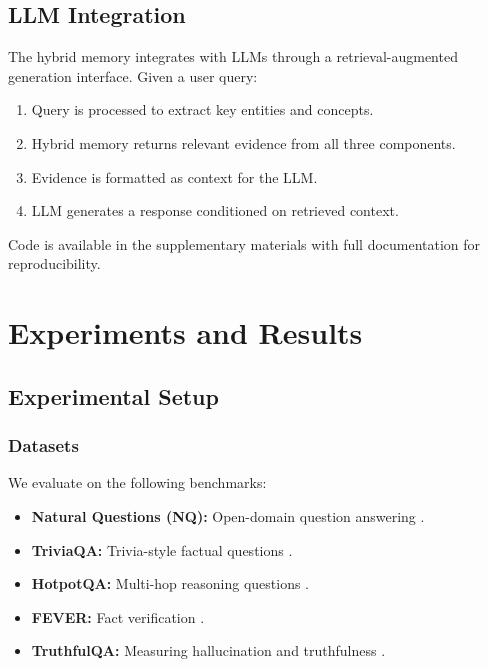 \documentclass[conference]{IEEEtran}
\begin{document}
\subsection{LLM Integration}

The hybrid memory integrates with LLMs through a retrieval-augmented generation interface. Given a user query:

\begin{enumerate}
    \item Query is processed to extract key entities and concepts.
    \item Hybrid memory returns relevant evidence from all three components.
    \item Evidence is formatted as context for the LLM.
    \item LLM generates a response conditioned on retrieved context.
\end{enumerate}

Code is available in the supplementary materials with full documentation for reproducibility.

\section{Experiments and Results}

\subsection{Experimental Setup}

\subsubsection{Datasets}

We evaluate on the following benchmarks:

\begin{itemize}
    \item \textbf{Natural Questions (NQ):} Open-domain question answering \cite{kwiatkowski2019natural}.
    \item \textbf{TriviaQA:} Trivia-style factual questions \cite{joshi2017triviaqa}.
    \item \textbf{HotpotQA:} Multi-hop reasoning questions \cite{yang2018hotpotqa}.
    \item \textbf{FEVER:} Fact verification \cite{thorne2018fever}.
    \item \textbf{TruthfulQA:} Measuring hallucination and truthfulness \cite{lin2022truthfulqa}.
\end{itemize}
\end{document}
